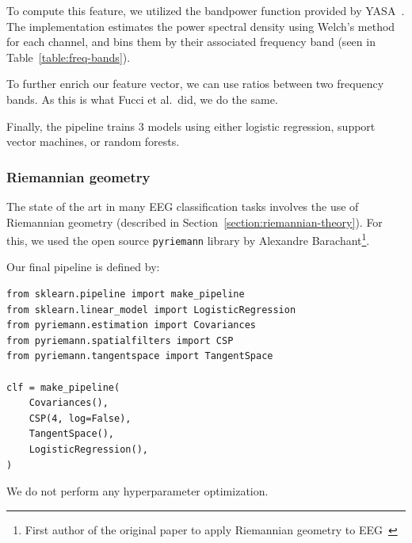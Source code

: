             To compute this feature, we utilized the bandpower function provided by YASA~\cite{vallat_yasa_2020}. The implementation estimates the power spectral density using Welch's method for each channel, and bins them by their associated frequency band (seen in Table~\ref{table:freq-bands}).

            To further enrich our feature vector, we can use ratios between two frequency bands. As this is what Fucci et al.\ did, we do the same.


            Finally, the pipeline trains 3 models using either logistic regression, support vector machines, or random forests.

        \subsubsection{Riemannian geometry}

            The state of the art in many EEG classification tasks involves the use of Riemannian geometry (described in Section~\ref{section:riemannian-theory}). For this, we used the open source \texttt{pyriemann} library by Alexandre Barachant\footnote{First author of the original paper to apply Riemannian geometry to EEG~\cite{barachant_classification_2013}}.

            Our final pipeline is defined by:

\begin{verbatim}
from sklearn.pipeline import make_pipeline
from sklearn.linear_model import LogisticRegression
from pyriemann.estimation import Covariances
from pyriemann.spatialfilters import CSP
from pyriemann.tangentspace import TangentSpace

clf = make_pipeline(
    Covariances(),
    CSP(4, log=False),
    TangentSpace(),
    LogisticRegression(),
)
\end{verbatim}

            We do not perform any hyperparameter optimization.

